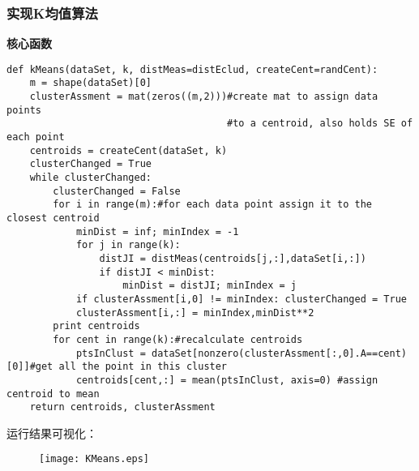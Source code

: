 \subsubsection{实现K均值算法}
\noindent\textbf{核心函数}
\begin{lstlisting}
def kMeans(dataSet, k, distMeas=distEclud, createCent=randCent):
    m = shape(dataSet)[0]
    clusterAssment = mat(zeros((m,2)))#create mat to assign data points
                                      #to a centroid, also holds SE of each point
    centroids = createCent(dataSet, k)
    clusterChanged = True
    while clusterChanged:
        clusterChanged = False
        for i in range(m):#for each data point assign it to the closest centroid
            minDist = inf; minIndex = -1
            for j in range(k):
                distJI = distMeas(centroids[j,:],dataSet[i,:])
                if distJI < minDist:
                    minDist = distJI; minIndex = j
            if clusterAssment[i,0] != minIndex: clusterChanged = True
            clusterAssment[i,:] = minIndex,minDist**2
        print centroids
        for cent in range(k):#recalculate centroids
            ptsInClust = dataSet[nonzero(clusterAssment[:,0].A==cent)[0]]#get all the point in this cluster
            centroids[cent,:] = mean(ptsInClust, axis=0) #assign centroid to mean
    return centroids, clusterAssment
\end{lstlisting}

\newpage
\noindent 运行结果可视化：
\begin{figure}[h]
  \centering
  \texttt{[image: KMeans.eps]}
\end{figure}

\newpage




